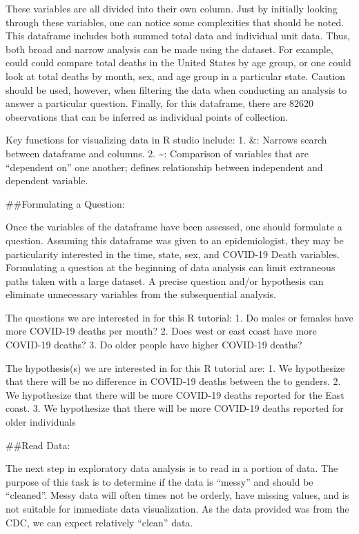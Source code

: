 \documentclass[
]{article}
\begin{document}
These variables are all divided into their own column. Just by initially
looking through these variables, one can notice some complexities that
should be noted. This dataframe includes both summed total data and
individual unit data. Thus, both broad and narrow analysis can be made
using the dataset. For example, could could compare total deaths in the
United States by age group, or one could look at total deaths by month,
sex, and age group in a particular state. Caution should be used,
however, when filtering the data when conducting an analysis to answer a
particular question. Finally, for this dataframe, there are 82620
observations that can be inferred as individual points of collection.

Key functions for visualizing data in R studio include: 1. \&: Narrows
search between dataframe and columns. 2. \textasciitilde: Comparison of
variables that are ``dependent on'' one another; defines relationship
between independent and dependent variable.

\#\#Formulating a Question:

Once the variables of the dataframe have been assessed, one should
formulate a question. Assuming this dataframe was given to an
epidemiologist, they may be particularity interested in the time, state,
sex, and COVID-19 Death variables. Formulating a question at the
beginning of data analysis can limit extraneous paths taken with a large
dataset. A precise question and/or hypothesis can eliminate unnecessary
variables from the subsequential analysis.

The questions we are interested in for this R tutorial: 1. Do males or
females have more COVID-19 deaths per month? 2. Does west or east coast
have more COVID-19 deaths? 3. Do older people have higher COVID-19
deaths?

The hypothesis(s) we are interested in for this R tutorial are: 1. We
hypothesize that there will be no difference in COVID-19 deaths between
the to genders. 2. We hypothesize that there will be more COVID-19
deaths reported for the East coast. 3. We hypothesize that there will be
more COVID-19 deaths reported for older individuals

\#\#Read Data:

The next step in exploratory data analysis is to read in a portion of
data. The purpose of this task is to determine if the data is ``messy''
and should be ``cleaned''. Messy data will often times not be orderly,
have missing values, and is not suitable for immediate data
visualization. As the data provided was from the CDC, we can expect
relatively ``clean'' data.
\end{document}
